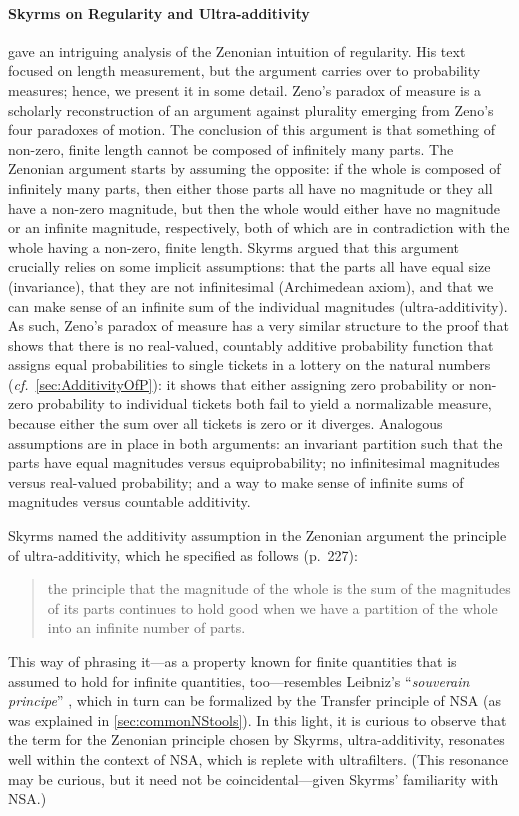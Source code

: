 \paragraph{Skyrms on Regularity and Ultra-additivity}\label{sec:Zenonian}
\citet{Skyrms:1983a} gave an intriguing analysis of the Zenonian intuition of regularity. His text focused on length measurement, but the argument carries over to probability measures; hence, we present it in some detail. Zeno's paradox of measure is a scholarly reconstruction of an argument against plurality emerging from Zeno's four paradoxes of motion. The conclusion of this argument is that something of non-zero, finite length cannot be composed of infinitely many parts. The Zenonian argument starts by assuming the opposite: if the whole is composed of infinitely many parts, then either those parts all have no magnitude or they all have a non-zero magnitude, but then the whole would either have no magnitude or an infinite magnitude, respectively, both of which are in contradiction with the whole having a non-zero, finite length.
Skyrms argued that this argument crucially relies on some implicit assumptions: that the parts all have equal size (invariance), that they are not infinitesimal (Archimedean axiom), and that we can make sense of an infinite sum of the individual magnitudes (ultra-additivity).
As such, Zeno's paradox of measure has a very similar structure to the proof that shows that there is no real-valued, countably additive probability function that assigns equal probabilities to single tickets in a lottery on the natural numbers (\textit{cf.}\ \autoref{sec:AdditivityOfP}): it shows that either assigning zero probability or non-zero probability to individual tickets both fail to yield a normalizable measure, because either the sum over all tickets is zero or it diverges. Analogous assumptions are in place in both arguments: an invariant partition such that the parts have equal magnitudes versus equiprobability; no infinitesimal magnitudes versus real-valued probability; and a way to make sense of infinite sums of magnitudes versus countable additivity.

Skyrms named the additivity assumption in the Zenonian argument the principle of ultra-additivity, which he specified as follows (p.~227):
\begin{quote}
the principle that the magnitude of the whole is the sum of the magnitudes of its parts continues to hold good when we have a partition of the whole into an infinite number of parts.
\end{quote}
This way of phrasing it---as a property known for finite quantities that is assumed to hold for infinite quantities, too---resembles Leibniz's ``\textit{souverain principe}'' \citep[see][section~4.3]{KatzSherry:2012a}, which in turn can be formalized by the Transfer principle of NSA (as was explained in \autoref{sec:commonNStools}). In this light, it is curious to observe that the term for the Zenonian principle chosen by Skyrms, ultra-additivity, resonates well within the context of NSA, which is replete with ultrafilters. (This resonance may be curious, but it need not be coincidental---given Skyrms' familiarity with NSA.)

